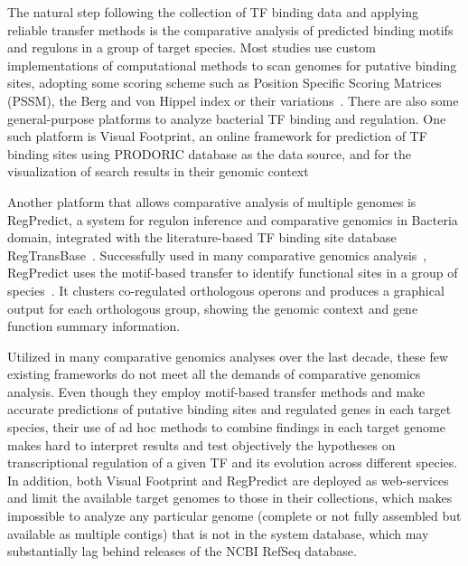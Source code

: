 The natural step following the collection of TF binding data and applying
reliable transfer methods is the comparative analysis of predicted binding
motifs and regulons in a group of target species. Most studies use custom
implementations of computational methods to scan genomes for putative binding
sites, adopting some scoring scheme such as Position Specific Scoring Matrices
(PSSM), the Berg and von Hippel index or their
variations~\cite{schneider1986information, berg1988selection,
  osada2004comparative, beckstette2006fast}. There are also some
general-purpose platforms to analyze bacterial TF binding and regulation. One
such platform is Visual Footprint, an online framework for prediction of TF
binding sites using PRODORIC database as the data source, and for the
visualization of search results in their genomic
context~\cite{munch2005virtual, munch2003prodoric}

Another platform that allows comparative analysis of multiple genomes is
RegPredict, a system for regulon inference and comparative genomics in Bacteria
domain, integrated with the literature-based TF binding site database
RegTransBase~\cite{novichkov2010regpredict,
  kazakov2007regtransbase}. Successfully used in many comparative genomics
analysis~\cite{ravcheev2012transcriptional, antunes2012global,
  novichkov2013regprecise, galperin2014comparative}, RegPredict uses the
motif-based transfer to identify
functional sites in a group of species~\cite{kilic2015assessment}. It clusters
co-regulated orthologous operons and produces a graphical output for each
orthologous group, showing the genomic context and gene function summary
information.

Utilized in many comparative genomics analyses over the last decade, these few
existing frameworks do not meet all the demands of comparative genomics
analysis. Even though they employ motif-based transfer methods and make
accurate predictions of putative binding sites and regulated genes in each
target species, their use of ad hoc methods to combine findings in each target
genome makes hard to interpret results and test objectively the hypotheses on
transcriptional regulation of a given TF and its evolution across different
species. In addition, both Visual Footprint and RegPredict are deployed as
web-services and limit the available target genomes to those in their
collections, which makes impossible to analyze any particular genome
(complete or not fully assembled but available as multiple contigs) that is not
in the system database, which may substantially lag behind releases of the NCBI
RefSeq database.

